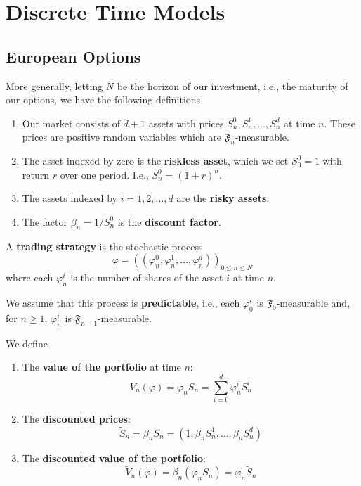 \section{Discrete Time Models}

\subsection{European Options}

More generally, letting $N$ be the horizon of our investment, i.e., the maturity of our options, we have the following definitions

\begin{definition}[Market]
    \begin{enumerate}
        \item Our market consists of $d+1$ assets with prices $S_n^0, S_n^1, \ldots, S_n^d$ at time $n$. These prices are positive random variables which are $\mathfrak{F}_n$-measurable.
        \item The asset indexed by zero is the \textbf{riskless asset}, which we set $S_0^0 = 1$ with return $r$ over one period. I.e., $S_n^0 = (1+r)^n$.
        \item The assets indexed by $i = 1, 2, \ldots, d$ are the \textbf{risky assets}.
        \item The factor $\beta_n = 1/S_n^0$ is the \textbf{discount factor}.
    \end{enumerate} 

\end{definition}

\begin{definition}
    A \textbf{trading strategy} is the stochastic process 
    \[
        \varphi = ((\varphi_n^0, \varphi_n^1, \ldots, \varphi_n^d))_{0 \leq n \leq N}
    \]
    where each $\varphi_n^i$ is the number of shares of the asset $i$ at time $n$. 

    We assume that this process is \textbf{predictable}, i.e., each $\varphi_0^i$ is $\mathfrak{F}_0$-measurable and, for $n \geq 1$, $\varphi_n^i$ is $\mathfrak{F}_{n-1}$-measurable. 
\end{definition}

\begin{definition}
    We define 
    \begin{enumerate}
        \item The \textbf{value of the portfolio} at time $n$:
        \[
            V_n(\varphi) = \varphi_n S_n = \sum_{i=0}^{d} \varphi_n^i S_n^i
        \]
        \item The \textbf{discounted prices}:
        \[ 
            \tilde{S}_n = \beta_n S_n = (1, \beta_n S_n^1, \ldots, \beta_n S_n^d)
        \]
        \item The \textbf{discounted value of the portfolio}:
        \[
            \tilde{V}_n(\varphi) = \beta_n (\varphi_n S_n) = \varphi_n \tilde{S}_n
        \]
    \end{enumerate}
\end{definition}

